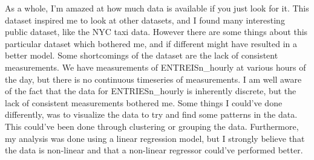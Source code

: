 \documentclass{article}
\begin{document}
As a whole, I'm amazed at how much data is available if you just look
for it. This dataset inspired me to look at other datasets, and I found
many interesting public dataset, like the NYC taxi data. However there
are some things about this particular dataset which bothered me, and if
different might have resulted in a better model. Some shortcomings of
the dataset are the lack of consistent measurements. We have
measurements of ENTREISn\_hourly at various hours of the day, but there
is no continuous timeseries of measurements. I am well aware of the fact
that the data for ENTRIESn\_hourly is inherently discrete, but the lack
of consistent measurements bothered me. Some things I could've done
differently, was to visualize the data to try and find some patterns in
the data. This could've been done through clustering or grouping the
data. Furthermore, my analysis was done using a linear regression model,
but I strongly believe that the data is non-linear and that a non-linear
regressor could've performed better.





    
\end{document}
